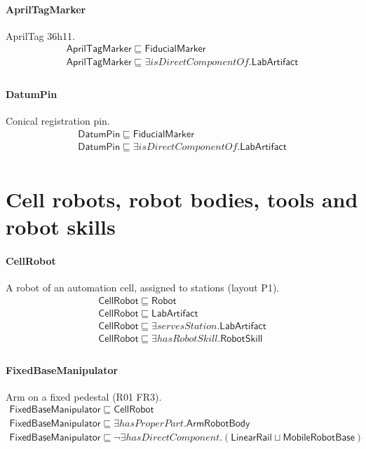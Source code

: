 \documentclass[10pt]{article}
\begin{document}
\paragraph{AprilTagMarker} AprilTag 36h11.
\[\begin{array}{l}
\mathsf{AprilTagMarker} \sqsubseteq  \mathsf{FiducialMarker} \\
\mathsf{AprilTagMarker} \sqsubseteq  \exists \mathit{isDirectComponentOf}.\mathsf{LabArtifact} \\
\end{array}\]
\paragraph{DatumPin} Conical registration pin.
\[\begin{array}{l}
\mathsf{DatumPin} \sqsubseteq  \mathsf{FiducialMarker} \\
\mathsf{DatumPin} \sqsubseteq  \exists \mathit{isDirectComponentOf}.\mathsf{LabArtifact} \\
\end{array}\]
\section*{Cell robots, robot bodies, tools and robot skills}
\paragraph{CellRobot} A robot of an automation cell, assigned to stations (layout P1).
\[\begin{array}{l}
\mathsf{CellRobot} \sqsubseteq  \mathsf{Robot} \\
\mathsf{CellRobot} \sqsubseteq  \mathsf{LabArtifact} \\
\mathsf{CellRobot} \sqsubseteq  \exists \mathit{servesStation}.\mathsf{LabArtifact} \\
\mathsf{CellRobot} \sqsubseteq  \exists \mathit{hasRobotSkill}.\mathsf{RobotSkill} \\
\end{array}\]
\paragraph{FixedBaseManipulator} Arm on a fixed pedestal (R01 FR3).
\[\begin{array}{l}
\mathsf{FixedBaseManipulator} \sqsubseteq  \mathsf{CellRobot} \\
\mathsf{FixedBaseManipulator} \sqsubseteq  \exists \mathit{hasProperPart}.\mathsf{ArmRobotBody} \\
\mathsf{FixedBaseManipulator} \sqsubseteq  \neg \exists \mathit{hasDirectComponent}.(\mathsf{LinearRail} \sqcup  \mathsf{MobileRobotBase}) \\
\end{array}\]
\end{document}
